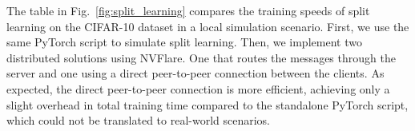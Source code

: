 \documentclass[11pt]{article}
\begin{document}
The table in Fig.~\ref{fig:split_learning} compares the training speeds of split learning on the CIFAR-10 dataset in a local simulation scenario. First, we use the same PyTorch script to simulate split learning. Then, we implement two distributed solutions using NVFlare. One that routes the messages through the server and one using a direct peer-to-peer connection between the clients. As expected, the direct peer-to-peer connection is more efficient, achieving only a slight overhead in total training time compared to the standalone PyTorch script, which could not be translated to real-world scenarios.


\end{document}
